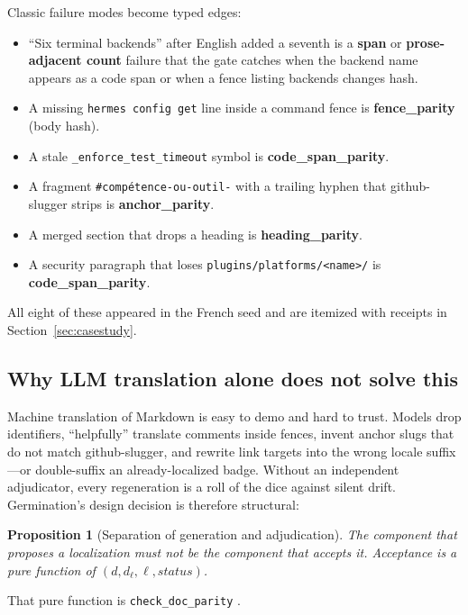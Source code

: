 \documentclass[11pt]{article}
\theoremstyle{definition}
\theoremstyle{plain}
\newtheorem{proposition}{Proposition}
\theoremstyle{remark}
\begin{document}
Classic failure modes become typed edges:
\begin{itemize}[leftmargin=*]
\item ``Six terminal backends'' after English added a seventh is a
  \textbf{span} or \textbf{prose-adjacent count} failure that the gate
  catches when the backend name appears as a code span or when a fence
  listing backends changes hash.
\item A missing \texttt{hermes config get} line inside a command fence is
  \textbf{fence\_parity} (body hash).
\item A stale \texttt{\_enforce\_test\_timeout} symbol is
  \textbf{code\_span\_parity}.
\item A fragment \texttt{\#comp\'etence-ou-outil-} with a trailing hyphen
  that github-slugger strips is \textbf{anchor\_parity}.
\item A merged section that drops a heading is \textbf{heading\_parity}.
\item A security paragraph that loses \texttt{plugins/platforms/<name>/} is
  \textbf{code\_span\_parity}.
\end{itemize}

All eight of these appeared in the French seed and are itemized with receipts
in Section~\ref{sec:casestudy}.

\subsection{Why LLM translation alone does not solve this}

Machine translation of Markdown is easy to demo and hard to trust. Models
drop identifiers, ``helpfully'' translate comments inside fences, invent
anchor slugs that do not match github-slugger, and rewrite link targets into
the wrong locale suffix---or double-suffix an already-localized badge.
Without an independent adjudicator, every regeneration is a roll of the dice
against silent drift. Germination's design decision is therefore structural:

\begin{proposition}[Separation of generation and adjudication]
\label{prop:separate}
The component that proposes a localization must not be the component that
accepts it. Acceptance is a pure function of $(d, d_\ell, \ell, \mathit{status})$.
\end{proposition}

That pure function is \texttt{check\_doc\_parity} \citep{hermespr80391}.


\end{document}
